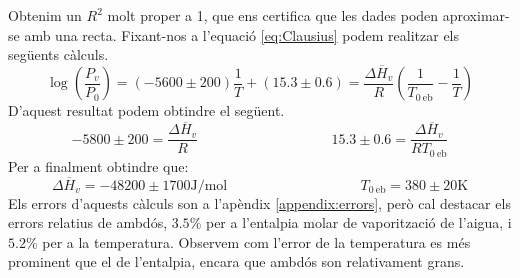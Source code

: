 \documentclass{article}
\begin{document}
        Obtenim un $R^2$ molt proper a 1, que ens certifica que les dades poden aproximar-se amb una recta. Fixant-nos a l'equació \ref{eq:Clausius} podem realitzar els següents càlculs. \[\log\left(\frac{P_v}{P_0}\right)=\left(-5600\pm200\right)\frac{1}{T}+\left(15.3\pm0.6\right)=\frac{\Delta\overline{H}_v}{R}\left(\frac{1}{T_{0\ \text{eb}}}-\frac{1}{T}\right)\] D'aquest resultat podem obtindre el següent.\[-5800\pm200=\frac{\Delta\overline{H}_v}{R} \hspace{4cm} 15.3\pm0.6=\frac{\Delta\overline{H}_v}{RT_{0\ \text{eb}}}\] Per a finalment obtindre que: \[\Delta\overline{H}_v = -48200\pm1700\si{\joule}\text{/}\si{\mol} \hspace{4cm} T_{0\ \text{eb}} = 380 \pm 20 \si{\kelvin}\]Els errors d'aquests càlculs son a l'apèndix \ref{appendix:errors}, però cal destacar els errors relatius de ambdós, $3.5\%$ per a l'entalpia molar de vaporització de l'aigua, i $5.2\%$ per a la temperatura. Observem com l'error de la temperatura es més prominent que el de l'entalpia, encara que ambdós son relativament grans.
        
    
\end{document}

